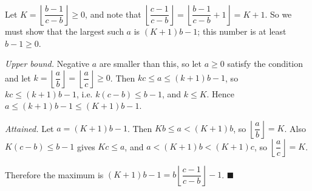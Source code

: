 Let $K=\left\lfloor\dfrac{b-1}{c-b}\right\rfloor\ge0$, and note that $\left\lfloor\dfrac{c-1}{c-b}\right\rfloor=\left\lfloor\dfrac{b-1}{c-b}+1\right\rfloor=K+1$. So we must show that the largest such $a$ is $(K+1)b-1$; this number is at least $b-1\ge0$.

\emph{Upper bound.} Negative $a$ are smaller than this, so let $a\ge0$ satisfy the condition and let $k=\left\lfloor\dfrac ab\right\rfloor=\left\lfloor\dfrac ac\right\rfloor\ge0$. Then $kc\le a\le(k+1)b-1$, so $kc\le(k+1)b-1$, i.e. $k(c-b)\le b-1$, and $k\le K$. Hence $a\le(k+1)b-1\le(K+1)b-1$.

\emph{Attained.} Let $a=(K+1)b-1$. Then $Kb\le a<(K+1)b$, so $\left\lfloor\dfrac ab\right\rfloor=K$. Also $K(c-b)\le b-1$ gives $Kc\le a$, and $a<(K+1)b<(K+1)c$, so $\left\lfloor\dfrac ac\right\rfloor=K$.

Therefore the maximum is $(K+1)b-1=b\left\lfloor\dfrac{c-1}{c-b}\right\rfloor-1$. $\blacksquare$
